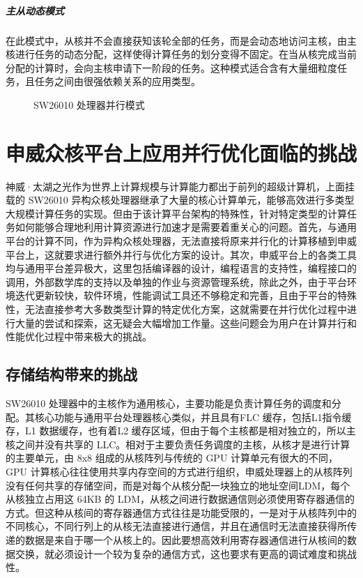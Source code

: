 \subparagraph{主从动态模式}
在此模式中，从核并不会直接获知该轮全部的任务，而是会动态地访问主核，由主核进行任务的动态分配，这样使得计算任务的划分变得不固定。在当从核完成当前分配的计算时，会向主核申请下一阶段的任务。这种模式适合含有大量细粒度任务，且任务之间由很强依赖关系的应用类型。

 \begin{figure}[h]
  \centering
  \hspace{0.5in}
  
    \hspace{0.5in}
  \caption{SW26010 处理器并行模式}
\end{figure}

\section{申威众核平台上应用并行优化面临的挑战}
神威·太湖之光作为世界上计算规模与计算能力都出于前列的超级计算机，上面挂载的 SW26010 异构众核处理器继承了大量的核心计算单元，能够高效进行多类型大规模计算任务的实现。但由于该计算平台架构的特殊性，针对特定类型的计算任务如何能够合理地利用计算资源进行加速才是需要着重关心的问题。首先，与通用平台的计算不同，作为异构众核处理器，无法直接将原来并行化的计算移植到申威平台上，这就要求进行额外并行与优化方案的设计。其次，申威平台上的各类工具均与通用平台差异极大，这里包括编译器的设计，编程语言的支持性，编程接口的调用，外部数学库的支持以及单独的作业与资源管理系统，除此之外，由于平台环境迭代更新较快，软件环境，性能调试工具还不够稳定和完善，且由于平台的特殊性，无法直接参考大多数类型计算的特定优化方案，这就需要在并行优化过程中进行大量的尝试和探索，这无疑会大幅增加工作量。这些问题会为用户在计算并行和性能优化过程中带来极大的挑战。

\subsection{存储结构带来的挑战}
SW26010 处理器中的主核作为通用核心，主要功能是负责计算任务的调度和分配。其核心功能与通用平台处理器核心类似，并且具有FLC 缓存，包括L1指令缓存，L1 数据缓存，也有着L2 缓存区域，但由于每个主核都是相对独立的，所以主核之间并没有共享的 LLC。相对于主要负责任务调度的主核，从核才是进行计算的主要单元，由 8x8 组成的从核阵列与传统的 GPU 计算单元有很大的不同，GPU 计算核心往往使用共享内存空间的方式进行组织，申威处理器上的从核阵列没有任何共享的存储空间，而是对每个从核分配一块独立的地址空间LDM，每个从核独立占用这 64KB 的 LDM，从核之间进行数据通信则必须使用寄存器通信的方式。但这种从核间的寄存器通信方式往往是功能受限的，一是对于从核阵列中的不同核心，不同行列上的从核无法直接进行通信，并且在通信时无法直接获得所传递的数据是来自于哪一个从核上的。因此要想高效利用寄存器通信进行从核间的数据交换，就必须设计一个较为复杂的通信方式，这也要求有更高的调试难度和挑战性。

